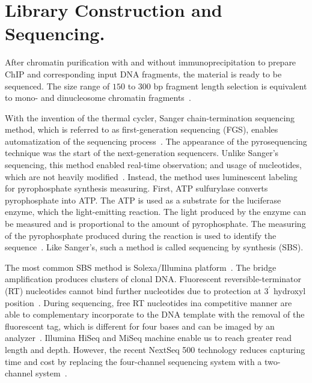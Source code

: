 











\section{Library Construction and Sequencing.}
After chromatin purification with and without immunoprecipitation to prepare ChIP and corresponding input DNA fragments, the material is ready to be sequenced. 
The size range of $150$ to $300$ bp fragment length selection is equivalent to mono- and dinucleosome chromatin fragments~\cite{kidder2011chip}.

With the invention of the thermal cycler,  Sanger chain-termination sequencing method, which is referred to as first-generation sequencing (FGS), enables automatization of the sequencing process~\cite{quail2012tale}. 
The appearance of the pyrosequencing technique was the start of the next-generation sequencers. 
Unlike Sanger's sequencing, this method enabled real-time observation; and usage of nucleotides, which are not heavily modified~\cite{ronaghi1996real, ronaghi1998sequencing}.
Instead, the method uses luminescent labeling for pyrophosphate synthesis measuring. 
First, ATP sulfurylase converts pyrophosphate into ATP. 
The ATP is used as a substrate for the luciferase enzyme, which the light-emitting reaction. 
The light produced by the enzyme can be measured and is proportional to the amount of pyrophosphate. 
The measuring of the pyrophosphate produced during the reaction is used to identify the sequence~\cite{hyman1988new}. 
Like Sanger's, such a method is called sequencing by synthesis (SBS).

The most common SBS method is Solexa/Illumina platform~\cite{voelkerding2009next}. 
The bridge amplification produces clusters of clonal DNA. 
Fluorescent reversible-terminator (RT) nucleotides cannot bind further nucleotides due to protection at $3^\prime$ hydroxyl position~\cite{heather2016sequence}. 
During sequencing, free RT nucleotides ina competitive manner are able to complementary incorporate to the DNA template with the removal of the fluorescent tag, which is different for four bases and can be imaged by an analyzer~\cite{berglund2011next}. 
Illumina HiSeq and MiSeq machine enable us to reach greater read length and depth. 
However, the recent NextSeq 500 technology reduces capturing time and cost by replacing the four-channel sequencing system with a two-channel system~\cite{reuter2015high}. 



